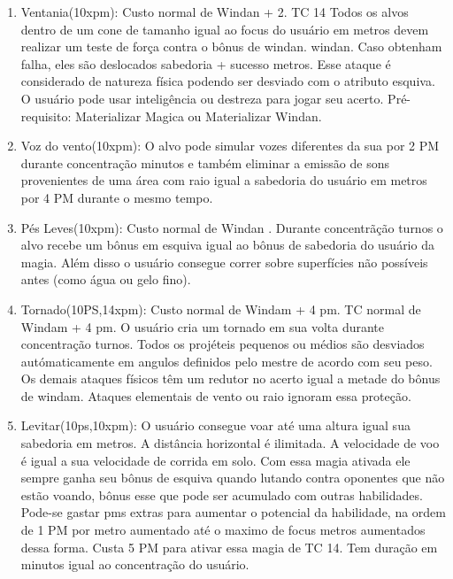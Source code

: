 \begin{enumerate}
	\item Ventania(10xpm): Custo normal de Windan + 2. TC 14\newline
Todos os alvos dentro de um cone de tamanho igual ao focus do usuário em metros devem realizar um teste de força contra o bônus de windan. windan. Caso obtenham falha, eles são deslocados sabedoria + sucesso metros. Esse ataque é considerado de natureza física podendo ser desviado com o atributo esquiva. O usuário pode usar inteligência ou destreza para jogar seu acerto. Pré-requisito: Materializar Magica ou Materializar Windan.

\item Voz do vento(10xpm): O alvo pode simular vozes diferentes da sua por 2 PM durante concentração minutos e também eliminar a emissão de sons provenientes de uma área com raio igual a sabedoria do usuário em metros por 4 PM durante o mesmo tempo. 
	
	\item Pés Leves(10xpm): Custo normal de Windan .\newline
Durante concentrãção turnos o alvo recebe um bônus em esquiva igual ao bônus de sabedoria do usuário da magia. Além disso o usuário consegue correr sobre superfícies não possíveis antes (como água ou gelo fino). 
	
\item Tornado(10PS,14xpm): Custo normal de Windam + 4 pm. TC normal de Windam + 4 pm.\newline
O usuário cria um tornado em sua volta durante concentração turnos. Todos os projéteis pequenos ou médios são desviados autómaticamente em angulos definidos pelo mestre de acordo com seu peso. Os demais ataques físicos têm um redutor no acerto igual a metade do bônus de windam. Ataques elementais de vento ou raio ignoram essa proteção.

\item Levitar(10ps,10xpm): O usuário consegue voar até uma altura igual sua sabedoria em metros. A distância horizontal é ilimitada. A velocidade de voo é igual a sua velocidade de corrida em solo. Com essa magia ativada ele sempre ganha seu bônus de esquiva quando lutando contra oponentes que não estão voando, bônus esse que pode ser acumulado com outras habilidades. Pode-se gastar pms extras para aumentar o potencial da habilidade, na ordem de 1 PM por metro aumentado até o maximo de focus metros aumentados dessa forma. Custa 5 PM para ativar essa magia de TC 14. Tem duração em minutos igual ao concentração do usuário.


\end{enumerate}

